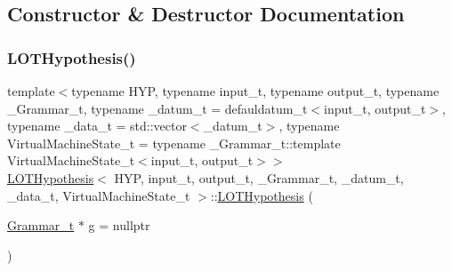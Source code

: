 \subsection{Constructor \& Destructor Documentation}
\mbox{\label{class_l_o_t_hypothesis_a2c1ff366f7a839d9acae415823ceb112}} 
\subsubsection{\texorpdfstring{L\+O\+T\+Hypothesis()}{LOTHypothesis()}\hspace{0.1cm}{\footnotesize\ttfamily [1/4]}}
{\footnotesize\ttfamily template$<$typename H\+YP, typename input\+\_\+t, typename output\+\_\+t, typename \+\_\+\+Grammar\+\_\+t, typename \+\_\+datum\+\_\+t = defauldatum\+\_\+t$<$input\+\_\+t, output\+\_\+t$>$, typename \+\_\+data\+\_\+t = std\+::vector$<$\+\_\+datum\+\_\+t$>$, typename Virtual\+Machine\+State\+\_\+t = typename \+\_\+\+Grammar\+\_\+t\+::template Virtual\+Machine\+State\+\_\+t$<$input\+\_\+t, output\+\_\+t$>$$>$ \\
\hyperlink{class_l_o_t_hypothesis}{L\+O\+T\+Hypothesis}$<$ H\+YP, input\+\_\+t, output\+\_\+t, \+\_\+\+Grammar\+\_\+t, \+\_\+datum\+\_\+t, \+\_\+data\+\_\+t, Virtual\+Machine\+State\+\_\+t $>$\+::\hyperlink{class_l_o_t_hypothesis}{L\+O\+T\+Hypothesis} (\begin{DoxyParamCaption}\item[{\hyperlink{class_l_o_t_hypothesis_a8006204013d471860e54c49d19edbace}{Grammar\+\_\+t} $\ast$}]{g = {\ttfamily nullptr} }\end{DoxyParamCaption})\hspace{0.3cm}{\ttfamily [inline]}}

\mbox{\label{class_l_o_t_hypothesis_aa14b68e8efcb570186fe289bc4a791d5}} 
